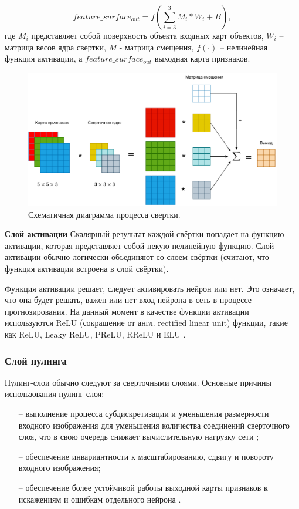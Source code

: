 \begin{equation}
feature\_surface_{out} = f\left(\sum_{i = 3}^3M_i \ast W_i + B\right),
\end{equation}
где $M_i$ представляет собой поверхность объекта входных карт объектов,  $W_i$ -- матрица весов ядра свертки, $M$ - матрица смещения, $f(\cdot)$ -- нелинейная функция активации, а $feature\_surface_{out}$ выходная карта признаков.

\begin{figure}[hbtp]
	\centering
	\includegraphics[width=\textwidth]{img/conv_layer.pdf}
	\caption{Схематичная диаграмма процесса свертки.}
	\label{fig:conv_layer}
\end{figure}

\textbf{Слой активации}
Скалярный результат каждой свёртки попадает на функцию активации, которая представляет собой некую нелинейную функцию. Слой активации обычно логически объединяют со слоем свёртки (считают, что функция активации встроена в слой свёртки). 

Функция активации решает, следует активировать нейрон или нет. Это означает, что она будет решать, важен или нет вход нейрона в сеть в процессе прогнозирования. На данный момент в качестве функции активации используются ReLU (сокращение от англ. rectified linear unit) функции, такие как ReLU, Leaky ReLU, PReLU, RReLU и ELU \cite{relu}.


\subsubsection{Слой пулинга}

Пулинг-слои обычно следуют за сверточными слоями. Основные причины использования пулинг-слоя:
\begin{itemize}[leftmargin=1.6\parindent]
	\item[--] выполнение процесса субдискретизации и уменьшения размерности входного изображения для уменьшения количества соединений сверточного слоя, что в свою очередь снижает вычислительную нагрузку сети \cite{pooling-layer-1};
	\item[--] обеспечение инвариантности к масштабированию, сдвигу и повороту входного изображения\cite{pooling-layer-2};
	\item[--] обеспечение более устойчивой работы выходной карты признаков к искажениям и ошибкам отдельного нейрона \cite{pooling-layer-3}.
\end{itemize}

